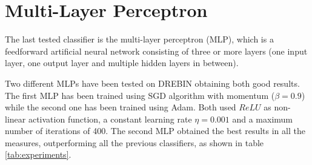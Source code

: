 \documentclass[paper=a4, fontsize=11pt]{scrartcl} %
\numberwithin{equation}{section} %
\numberwithin{figure}{section} %
\numberwithin{table}{section} %
\theoremstyle{definition}
\begin{document}


\section{Multi-Layer Perceptron}

The last tested classifier is the multi-layer perceptron (MLP), which is a
feedforward artificial neural network consisting of three or more layers (one
input layer, one output layer and multiple hidden layers in between).

Two different MLPs have been tested on DREBIN obtaining both good results. The
first MLP has been trained using SGD algorithm with momentum ($\beta=0.9$) while the second
one has been trained using Adam. Both used $ReLU$ as non-linear activation
function, a constant learning rate $\eta=0.001$
and a maximum number of iterations of 400.
The second MLP obtained the best results in all the measures, outperforming
all the previous classifiers, as shown in table \ref{tab:experiments}.

\end{document}
